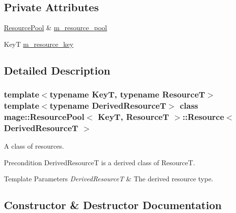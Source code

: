 \subsection*{Private Attributes}
\begin{DoxyCompactItemize}
\item 
\hyperlink{classmage_1_1_resource_pool}{Resource\+Pool} \& \hyperlink{classmage_1_1_resource_pool_1_1_resource_a9e5b68fd638ed6bd3b271afff834aced}{m\+\_\+resource\+\_\+pool}
\item 
KeyT \hyperlink{classmage_1_1_resource_pool_1_1_resource_a7200f97a65becde72367c9d0e3641621}{m\+\_\+resource\+\_\+key}
\end{DoxyCompactItemize}


\subsection{Detailed Description}
\subsubsection*{template$<$typename KeyT, typename ResourceT$>$\newline
template$<$typename Derived\+ResourceT$>$\newline
class mage\+::\+Resource\+Pool$<$ Key\+T, Resource\+T $>$\+::\+Resource$<$ Derived\+Resource\+T $>$}

A class of resources.

\begin{DoxyPrecond}{Precondition}
{\ttfamily Derived\+ResourceT} is a derived class of {\ttfamily ResourceT}. 
\end{DoxyPrecond}

\begin{DoxyTemplParams}{Template Parameters}
{\em Derived\+ResourceT} & The derived resource type. \\
\hline
\end{DoxyTemplParams}


\subsection{Constructor \& Destructor Documentation}
\hypertarget{classmage_1_1_resource_pool_1_1_resource_ab02c587d973bc5b400d9708a06c327c4}{}\label{classmage_1_1_resource_pool_1_1_resource_ab02c587d973bc5b400d9708a06c327c4} 

